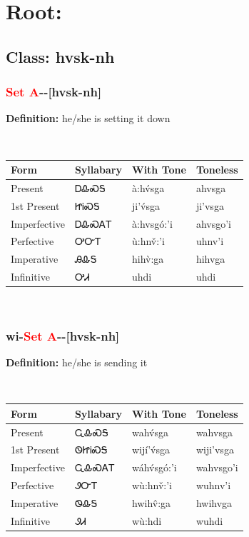\needspace{4in}
\section*{Root: }
\markboth{}{}
\nopagebreak
{}
\needspace{3in}
\subsection*{Class: hvsk-nh}
\nopagebreak
\needspace{2in}
\subsubsection*{\textcolor{Red}{Set A}{-}\textbf{}{-}[hvsk-nh]}
\nopagebreak
\textbf{Definition: } he/she is setting it down
\\[0.5em]
\begin{tabularx}{\textwidth}{l X X X}%
\toprule%
\textbf{Form}&\textbf{Syllabary}&\textbf{With Tone}&\textbf{Toneless}\\%
\midrule%
Present&ᎠᎲᏍᎦ&à:hv́sga&ahvsga\\%
1st Present&ᏥᎥᏍᎦ&ji’v́sga&ji’vsga\\%
Imperfective&ᎠᎲᏍᎪᎢ&à:hvsgó:’i&ahvsgo’i\\%
Perfective&ᎤᏅᎢ&ù:hnv̌:’i&uhnv’i\\%
Imperative&ᎯᎲᎦ&hihv̀:ga&hihvga\\%
Infinitive&ᎤᏗ&uhdi&uhdi\\%
\bottomrule%
\end{tabularx}
\\[1em]
\needspace{2in}
\subsubsection*{wi{-}\textcolor{Red}{Set A}{-}\textbf{}{-}[hvsk-nh]}
\nopagebreak
\textbf{Definition: } he/she is sending it
\\[0.5em]
\begin{tabularx}{\textwidth}{l X X X}%
\toprule%
\textbf{Form}&\textbf{Syllabary}&\textbf{With Tone}&\textbf{Toneless}\\%
\midrule%
Present&ᏩᎲᏍᎦ&wahv́sga&wahvsga\\%
1st Present&ᏫᏥᎥᏍᎦ&wijí’v́sga&wiji’vsga\\%
Imperfective&ᏩᎲᏍᎪᎢ&wáhv́sgó:’i&wahvsgo’i\\%
Perfective&ᏭᏅᎢ&wù:hnv̌:’i&wuhnv’i\\%
Imperative&ᏫᎲᎦ&hwihv̂:ga&hwihvga\\%
Infinitive&ᏭᏗ&wù:hdi&wuhdi\\%
\bottomrule%
\end{tabularx}
\\[1em]
\needspace{3in}
